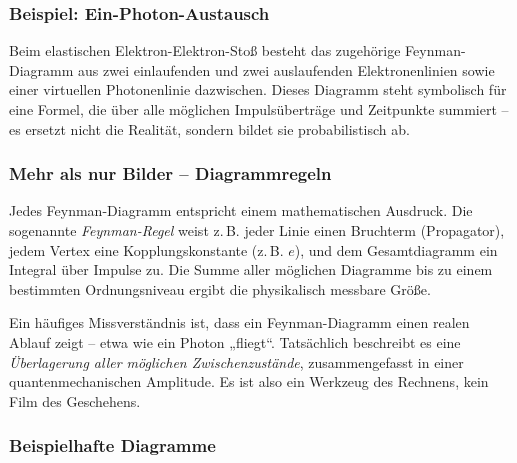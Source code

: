 \subsubsection*{Beispiel: Ein-Photon-Austausch}
Beim elastischen Elektron-Elektron-Stoß besteht das zugehörige Feyn\-man-Diagramm aus zwei einlaufenden und zwei auslaufenden Elektronenlinien sowie einer virtuellen Photonenlinie dazwischen. Dieses Diagramm steht symbolisch für eine Formel, die über alle möglichen Impulsüberträge und Zeitpunkte summiert – es ersetzt nicht die Realität, sondern bildet sie probabilistisch ab.

\subsubsection*{Mehr als nur Bilder – Diagrammregeln}
{}
Jedes Feynman-Diagramm entspricht einem mathematischen Ausdruck. Die sogenannte \emph{Feynman-Regel} weist z.\,B. jeder Linie einen Bruchterm (Propagator), jedem Vertex eine Kopplungskonstante (z.\,B. $e$), und dem Gesamtdiagramm ein Integral über Impulse zu. Die Summe aller möglichen Diagramme bis zu einem bestimmten Ordnungsniveau ergibt die physikalisch messbare Größe.

\vspace{1em}
\begin{tcolorbox}[didaktikbox, title=Diagramm ist nicht gleich Realität]
	\label{boxx:Diagramm ist nicht gleich realität}
	Ein häufiges Missverständnis ist, dass ein Feynman-Diagramm einen realen Ablauf zeigt – etwa wie ein Photon „fliegt“. Tatsächlich beschreibt es eine \emph{Überlagerung aller möglichen Zwischenzustände}, zusammengefasst in einer quantenmechanischen Amplitude. Es ist also ein Werkzeug des Rechnens, kein Film des Geschehens.
\end{tcolorbox}

\subsubsection{Beispielhafte Diagramme}

